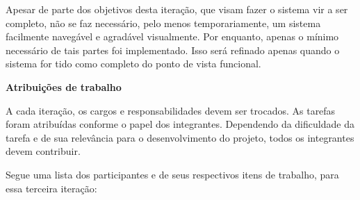 \documentclass[12pt,letterpaper]{article}
\begin{document}
Apesar de parte dos objetivos desta iteração, que visam fazer o sistema vir a ser 
completo, não se faz necessário, pelo menos temporariamente, um sistema facilmente 
navegável e agradável visualmente. Por enquanto, apenas o mínimo necessário de tais 
partes foi implementado. Isso será refinado apenas quando o sistema for tido como completo 
do ponto de vista funcional.





\vspace{1cm}
{\large {\bf Atribuições de trabalho}}
\vspace{0.5cm}

A cada iteração, os cargos e responsabilidades devem ser trocados. As tarefas foram atribuídas conforme o papel dos integrantes. Dependendo da dificuldade da tarefa e de sua relevância para o desenvolvimento do projeto, todos os integrantes devem contribuir.

Segue uma lista dos participantes e de seus respectivos itens de trabalho, para essa terceira iteração: 
\end{document}

